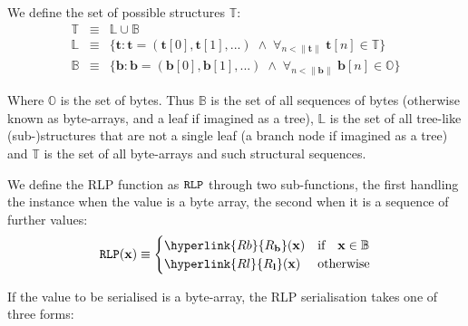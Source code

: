\documentclass[9pt,oneside]{amsart}
\begin{document}
We define the set of possible structures $\mathbb{T}$:
\begin{eqnarray}
\mathbb{T} & \equiv & \mathbb{L} \cup \mathbb{B} \\
\mathbb{L} & \equiv & \{ \mathbf{t}: \mathbf{t} = ( \mathbf{t}[0], \mathbf{t}[1], ... ) \; \wedge \; \forall_{n < \lVert \mathbf{t} \rVert} \; \mathbf{t}[n] \in \mathbb{T} \} \\
\mathbb{B} & \equiv & \{ \mathbf{b}: \mathbf{b} = ( \mathbf{b}[0], \mathbf{b}[1], ... ) \; \wedge \; \forall_{n < \lVert \mathbf{b} \rVert} \; \mathbf{b}[n] \in \mathbb{O} \}
\end{eqnarray}

Where $\mathbb{O}$ is the set of bytes. Thus $\mathbb{B}$ is the set of all sequences of bytes (otherwise known as byte-arrays, and a leaf if imagined as a tree), $\mathbb{L}$ is the set of all tree-like (sub-)structures that are not a single leaf (a branch node if imagined as a tree) and $\mathbb{T}$ is the set of all byte-arrays and such structural sequences.

We define the RLP function as $\mathtt{\tiny RLP}$ through two sub-functions, the first handling the instance when the value is a byte array, the second when it is a sequence of further values:
\begin{equation}
\mathtt{\tiny RLP}(\mathbf{x}) \equiv \begin{cases} \hyperlink{R b}{R_\mathbf{b}}(\mathbf{x}) & \text{if} \quad \mathbf{x} \in \mathbb{B} \\ \hyperlink{R l}{R_\mathbf{l}}(\mathbf{x}) & \text{otherwise} \end{cases}
\end{equation}

If the value to be serialised is a byte-array, the RLP serialisation takes one of three forms:
\end{document}
